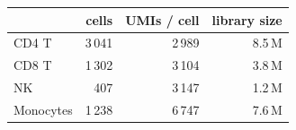 \begin{tabular}{lrrr}\toprule
 & cells & UMIs / cell & library size\\\midrule
CD4 T & 3\,041 & 2\,989 & 8.5\,M\\
CD8 T & 1\,302 & 3\,104 & 3.8\,M\\
NK & 407 & 3\,147 & 1.2\,M\\
Monocytes & 1\,238 & 6\,747 & 7.6\,M\\
\bottomrule\end{tabular}
